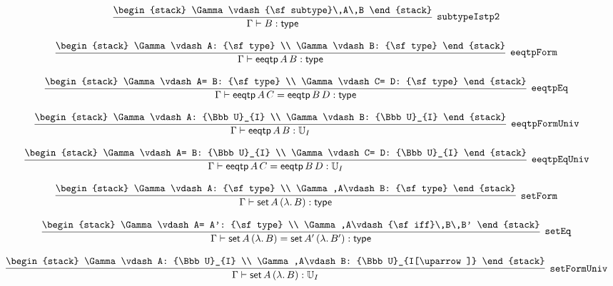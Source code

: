 \[
\infer[{\tt subtypeIstp2}]{\Gamma \vdash B: {\sf type}}{
\begin{stack}
\Gamma \vdash {\sf subtype}\,A\,B
\end{stack}}
\]

\[
\infer[{\tt eeqtpForm}]{\Gamma \vdash {\sf eeqtp}\,A\,B: {\sf type}}{
\begin{stack}
\Gamma \vdash A: {\sf type}
\\
\Gamma \vdash B: {\sf type}
\end{stack}}
\]

\[
\infer[{\tt eeqtpEq}]{\Gamma \vdash {\sf eeqtp}\,A\,C= {\sf eeqtp}\,B\,D: {\sf type}}{
\begin{stack}
\Gamma \vdash A= B: {\sf type}
\\
\Gamma \vdash C= D: {\sf type}
\end{stack}}
\]

\[
\infer[{\tt eeqtpFormUniv}]{\Gamma \vdash {\sf eeqtp}\,A\,B: {\Bbb U}_{I}}{
\begin{stack}
\Gamma \vdash A: {\Bbb U}_{I}
\\
\Gamma \vdash B: {\Bbb U}_{I}
\end{stack}}
\]

\[
\infer[{\tt eeqtpEqUniv}]{\Gamma \vdash {\sf eeqtp}\,A\,C= {\sf eeqtp}\,B\,D: {\Bbb U}_{I}}{
\begin{stack}
\Gamma \vdash A= B: {\Bbb U}_{I}
\\
\Gamma \vdash C= D: {\Bbb U}_{I}
\end{stack}}
\]

\[
\infer[{\tt setForm}]{\Gamma \vdash {\sf set}\,A\,(\lambda .\,B): {\sf type}}{
\begin{stack}
\Gamma \vdash A: {\sf type}
\\
\Gamma ,A\vdash B: {\sf type}
\end{stack}}
\]

\[
\infer[{\tt setEq}]{\Gamma \vdash {\sf set}\,A\,(\lambda .\,B)= {\sf set}\,A'\,(\lambda .\,B'): {\sf type}}{
\begin{stack}
\Gamma \vdash A= A': {\sf type}
\\
\Gamma ,A\vdash {\sf iff}\,B\,B'
\end{stack}}
\]

\[
\infer[{\tt setFormUniv}]{\Gamma \vdash {\sf set}\,A\,(\lambda .\,B): {\Bbb U}_{I}}{
\begin{stack}
\Gamma \vdash A: {\Bbb U}_{I}
\\
\Gamma ,A\vdash B: {\Bbb U}_{I[\uparrow ]}
\end{stack}}
\]

